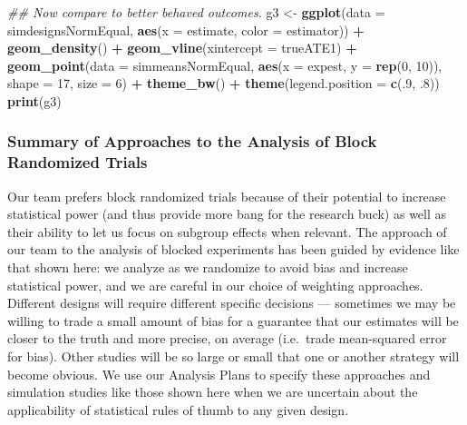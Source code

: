 \documentclass[
  12pt,
]{book}
\newenvironment{Shaded}{\begin{snugshade}}{\end{snugshade}}
\newcommand{\CommentTok}[1]{\textcolor[rgb]{0.56,0.35,0.01}{\textit{#1}}}
\newcommand{\DataTypeTok}[1]{\textcolor[rgb]{0.13,0.29,0.53}{#1}}
\newcommand{\DecValTok}[1]{\textcolor[rgb]{0.00,0.00,0.81}{#1}}
\newcommand{\FloatTok}[1]{\textcolor[rgb]{0.00,0.00,0.81}{#1}}
\newcommand{\KeywordTok}[1]{\textcolor[rgb]{0.13,0.29,0.53}{\textbf{#1}}}
\newcommand{\NormalTok}[1]{#1}
\newcommand{\OperatorTok}[1]{\textcolor[rgb]{0.81,0.36,0.00}{\textbf{#1}}}
\newcommand{\StringTok}[1]{\textcolor[rgb]{0.31,0.60,0.02}{#1}}
\theoremstyle{definition}
\theoremstyle{definition}
\theoremstyle{definition}
\theoremstyle{remark}
\begin{document}
\begin{Shaded}
\begin{Highlighting}[]
\CommentTok{## Now compare to better behaved outcomes.}
\NormalTok{g3 <-}\StringTok{ }\KeywordTok{ggplot}\NormalTok{(}\DataTypeTok{data =}\NormalTok{ simdesignsNormEqual, }\KeywordTok{aes}\NormalTok{(}\DataTypeTok{x =}\NormalTok{ estimate, }\DataTypeTok{color =}\NormalTok{ estimator)) }\OperatorTok{+}
\StringTok{  }\KeywordTok{geom_density}\NormalTok{() }\OperatorTok{+}
\StringTok{  }\KeywordTok{geom_vline}\NormalTok{(}\DataTypeTok{xintercept =}\NormalTok{ trueATE1) }\OperatorTok{+}
\StringTok{  }\KeywordTok{geom_point}\NormalTok{(}\DataTypeTok{data =}\NormalTok{ simmeansNormEqual, }\KeywordTok{aes}\NormalTok{(}\DataTypeTok{x =}\NormalTok{ expest, }\DataTypeTok{y =} \KeywordTok{rep}\NormalTok{(}\DecValTok{0}\NormalTok{, }\DecValTok{10}\NormalTok{)), }\DataTypeTok{shape =} \DecValTok{17}\NormalTok{, }\DataTypeTok{size =} \DecValTok{6}\NormalTok{) }\OperatorTok{+}
\StringTok{  }\KeywordTok{theme_bw}\NormalTok{() }\OperatorTok{+}
\StringTok{  }\KeywordTok{theme}\NormalTok{(}\DataTypeTok{legend.position =} \KeywordTok{c}\NormalTok{(.}\DecValTok{9}\NormalTok{, }\FloatTok{.8}\NormalTok{))}
\KeywordTok{print}\NormalTok{(g3)}
\end{Highlighting}
\end{Shaded}

\hypertarget{summary-of-approaches-to-the-analysis-of-block-randomized-trials}{%
\subsubsection{Summary of Approaches to the Analysis of Block Randomized
Trials}\label{summary-of-approaches-to-the-analysis-of-block-randomized-trials}}

Our team prefers block randomized trials because of their potential to
increase statistical power (and thus provide more bang for the research
buck) as well as their ability to let us focus on subgroup effects when
relevant. The approach of our team to the analysis of blocked
experiments has been guided by evidence like that shown here: we analyze
as we randomize to avoid bias and increase statistical power, and we are
careful in our choice of weighting approaches. Different designs will
require different specific decisions --- sometimes we may be willing to
trade a small amount of bias for a guarantee that our estimates will be
closer to the truth and more precise, on average (i.e.~trade
mean-squared error for bias). Other studies will be so large or small
that one or another strategy will become obvious. We use our Analysis
Plans to specify these approaches and simulation studies like those
shown here when we are uncertain about the applicability of statistical
rules of thumb to any given design.
\end{document}
